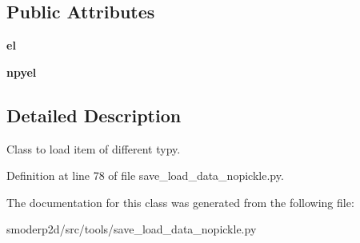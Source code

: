 \subsection*{Public Attributes}
\begin{DoxyCompactItemize}
\item 
\hypertarget{classsmoderp2d_1_1src_1_1tools_1_1save__load__data__nopickle_1_1LoadItems_a6040f17ef701cee845a742b55eb00731}{{\bfseries el}}\label{classsmoderp2d_1_1src_1_1tools_1_1save__load__data__nopickle_1_1LoadItems_a6040f17ef701cee845a742b55eb00731}

\item 
\hypertarget{classsmoderp2d_1_1src_1_1tools_1_1save__load__data__nopickle_1_1LoadItems_ac4d2dd0def0a15b24ceedbbcefba9664}{{\bfseries npyel}}\label{classsmoderp2d_1_1src_1_1tools_1_1save__load__data__nopickle_1_1LoadItems_ac4d2dd0def0a15b24ceedbbcefba9664}

\end{DoxyCompactItemize}


\subsection{Detailed Description}
Class to load item of different typy. 

Definition at line 78 of file save\-\_\-load\-\_\-data\-\_\-nopickle.\-py.



The documentation for this class was generated from the following file\-:\begin{DoxyCompactItemize}
\item 
smoderp2d/src/tools/save\-\_\-load\-\_\-data\-\_\-nopickle.\-py\end{DoxyCompactItemize}
